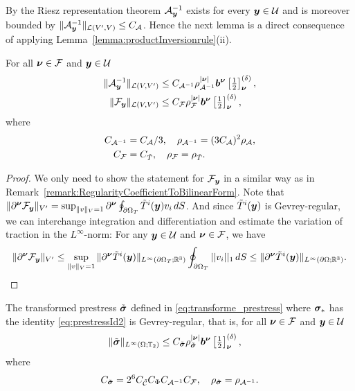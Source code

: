 By the Riesz representation theorem $\mathcal{A}_{{\boldsymbol{y}}}^{-1} $ exists for every ${\boldsymbol{y}} \in \mathcal{U}$ and is moreover bounded by $\| \mathcal{A}_{{\boldsymbol{y}}}^{-1} \|_{\mathcal{L}(V',V)} \leq C_{\mathcal{A}}$. Hence the next lemma is a direct consequence of applying Lemma~\ref{lemma:productInversionrule}(ii).
\begin{lemma}\label{lemma:GevreyRegInverseOfAyandFy}
    For all ${\boldsymbol{\nu}} \in \mathcal{F}$ and ${\boldsymbol{y}} \in \mathcal{U}$
    \begin{align*}
        \| \mathcal{A}_{{\boldsymbol{y}}}^{-1} \|_{\mathcal{L}(V,V')}& \leq C_{\mathcal{A}^{-1}} \rho_{\mathcal{A}^{-1}}^{\vert {\boldsymbol{\nu}} \vert} {\boldsymbol{b}}^{{\boldsymbol{\nu}}} \left[\tfrac{1}{2} \right]^{(\delta)}_{{\boldsymbol{\nu}}}, \\
        \| \mathcal{F}_{\boldsymbol{y}} \|_{\mathcal{L}(V,V')} & \leq C_{\mathcal{F}} \rho_{\mathcal{F}}^{\vert {\boldsymbol{\nu}} \vert} {\boldsymbol{b}}^{{\boldsymbol{\nu}}} \left[\tfrac{1}{2} \right]^{(\delta)}_{{\boldsymbol{\nu}}},
    \end{align*}
    where
    \begin{align} \label{eq:constantsInverseAyReg}
        C_{\mathcal{A}^{-1}} &= C_{\mathcal{A}}/3 ,\quad \rho_{\mathcal{A}^{-1}} = (3C_{\mathcal{A}})^2 \rho_{\mathcal{A}}, \\
        \label{eq:constantsFyReg}
        C_{\mathcal{F}} &= C_{\tilde T} ,\quad \rho_{\mathcal{F}} = \rho_{\tilde T}.
    \end{align}
\end{lemma}
\begin{proof} We only need to show the statement for $\mathcal{F}_{\boldsymbol{y}}$ in a similar way as in Remark~\ref{remark:RegularityCoefficientToBilinearForm}.
    Note that $ \| \partial^{\boldsymbol{\nu}}  \mathcal{F}_{{\boldsymbol{y}}} \|_{V'} = \sup_{ \|v \|_V = 1 } \partial^{\boldsymbol{\nu}}   \oint_{\partial \Omega_T} \tilde T^i({\boldsymbol{y}}) v_i \mathop{dS} $. And since $ \tilde T^i({\boldsymbol{y}})$ is Gevrey-regular, we can interchange integration and differentiation and estimate the variation of traction in the $L^\infty$-norm: For any ${\boldsymbol{y}} \in \mathcal{U}$ and ${\boldsymbol{\nu}} \in \mathcal{F}$, we have
    \begin{align*}
        \| \partial^{\boldsymbol{\nu}}  \mathcal{F}_{{\boldsymbol{y}}} \|_{V'} \leq    \sup_{ \|v \|_V = 1 }  \|\partial^{\boldsymbol{\nu}} \tilde T^i({\boldsymbol{y}}) \|_{L^\infty(\partial \Omega_T; \mathbb{R}^3)} \oint_{\partial\Omega_T} || v_i||_1 \mathop{dS} \leq  \|\partial^{\boldsymbol{\nu}} \tilde T^i({\boldsymbol{y}}) \|_{L^\infty(\partial \Omega; \mathbb{R}^3)}.
    \end{align*}
\end{proof}
\begin{lemma}\label{lemma:GevreyRegularityPrestress}
The transformed prestress $\tilde {\boldsymbol{\sigma}}$ defined in \eqref{eq:transforme_prestress} where $\boldsymbol{\sigma}_*$ has the identity \eqref{eq:prestressId2} is Gevrey-regular,
that is, for all ${\boldsymbol{\nu}} \in \mathcal{F}$ and ${\boldsymbol{y}} \in \mathcal{U}$
    \begin{align*}
        \| \tilde  {\boldsymbol{\sigma}}  \|_{L^\infty(\Omega;\mathbb{T}_2)} & \leq C_{\tilde  {\boldsymbol{\sigma}}} \rho_{\tilde  {\boldsymbol{\sigma}}}^{\vert {\boldsymbol{\nu}} \vert} {\boldsymbol{b}}^{{\boldsymbol{\nu}}} \left[\tfrac{1}{2} \right]^{(\delta)}_{{\boldsymbol{\nu}}},
    \end{align*}
    where
    \begin{align} 
        \label{eq:constantsTransformedPrestressReg}
        C_{\tilde  {\boldsymbol{\sigma}}}= 2^6 C_{\tilde {\mathcal{C}}} C_{\Phi} C_{\mathcal{A}^{-1}} C_{\mathcal{F}},\quad \rho_{\tilde  {\boldsymbol{\sigma}}} = \rho_{\mathcal{A}^{-1}}.
    \end{align}
\end{lemma}
